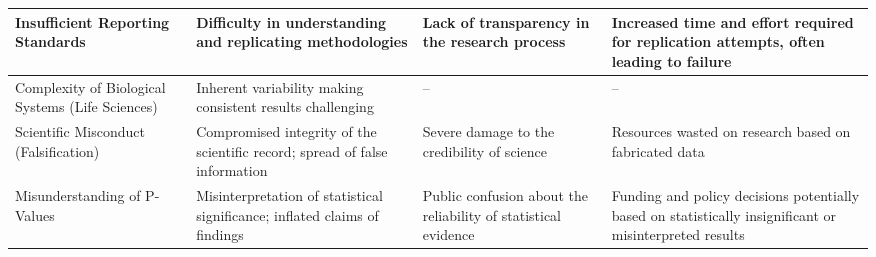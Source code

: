 \documentclass{article}
\begin{document}
\begin{table}[ht]
\begin{tabularx}{\textwidth}{|X|X|X|X|}
        \hline
        Insufficient Reporting Standards                 & Difficulty in understanding and replicating methodologies                       & Lack of transparency in the research process                        & Increased time and effort required for replication attempts, often leading to failure                   \\
        \hline
        Complexity of Biological Systems (Life Sciences) & Inherent variability making consistent results challenging                      & --                                                                  & --                                                                                                      \\
        \hline
        Scientific Misconduct (Falsification)            & Compromised integrity of the scientific record; spread of false information     & Severe damage to the credibility of science                         & Resources wasted on research based on fabricated data                                                   \\
        \hline
        Misunderstanding of P-Values                     & Misinterpretation of statistical significance; inflated claims of findings      & Public confusion about the reliability of statistical evidence      & Funding and policy decisions potentially based on statistically insignificant or misinterpreted results \\
        \hline
    \end{tabularx}
\end{table}





\end{document}
